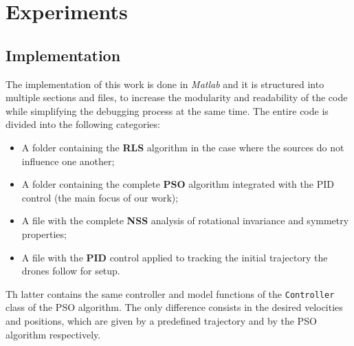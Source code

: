 \chapter{Experiments}

\section{Implementation}
The implementation of this work is done in \textit{Matlab} and it
is structured into multiple sections and files, to increase the modularity and 
readability of the code while simplifying the debugging process at the same time. 
The entire code is divided into the following categories:
\begin{itemize}
    \item A folder containing the \textbf{RLS} algorithm in the case where the sources
    do not influence one another;
    \item A folder containing the complete \textbf{PSO} algorithm integrated with 
    the PID control (the main focus of our work);
    \item A file with the complete \textbf{NSS} analysis of rotational invariance
    and symmetry properties;
    \item A file with the \textbf{PID} control applied to tracking the initial trajectory
    the drones follow for setup.
\end{itemize}
Th latter contains the same controller and model functions of the \texttt{Controller}
class of the PSO algorithm. The only difference consists in the desired velocities and positions, 
which are given by a predefined trajectory and by the PSO algorithm
respectively.

